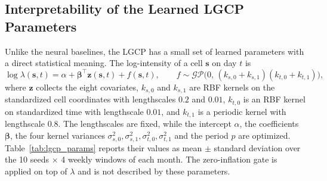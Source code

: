 \subsection{Interpretability of the Learned LGCP Parameters}
\label{app:interpretability}

Unlike the neural baselines, the LGCP has a small set of learned parameters with a direct statistical meaning. The log-intensity of a cell $\mathbf{s}$ on day $t$ is
\begin{equation}
\log\lambda(\mathbf{s},t)=\alpha+\boldsymbol{\beta}^\top\mathbf{z}(\mathbf{s},t)+f(\mathbf{s},t),
\qquad
f\sim\mathcal{GP}\bigl(0,\,(k_{s,0}+k_{s,1})(k_{t,0}+k_{t,1})\bigr),
\label{eq:lgcp_interp}
\end{equation}
where $\mathbf{z}$ collects the eight covariates, $k_{s,0}$ and $k_{s,1}$ are RBF kernels on the standardized cell coordinates with lengthscales $0.2$ and $0.01$, $k_{t,0}$ is an RBF kernel on standardized time with lengthscale $0.01$, and $k_{t,1}$ is a periodic kernel with lengthscale $0.8$. The lengthscales are fixed, while the intercept $\alpha$, the coefficients $\boldsymbol{\beta}$, the four kernel variances $\sigma^2_{s,0},\sigma^2_{s,1},\sigma^2_{t,0},\sigma^2_{t,1}$ and the period $p$ are optimized. Table~\ref{tab:lgcp_params} reports their values as mean $\pm$ standard deviation over the 10 seeds $\times$ 4 weekly windows of each month. The zero-inflation gate is applied on top of $\lambda$ and is not described by these parameters.

